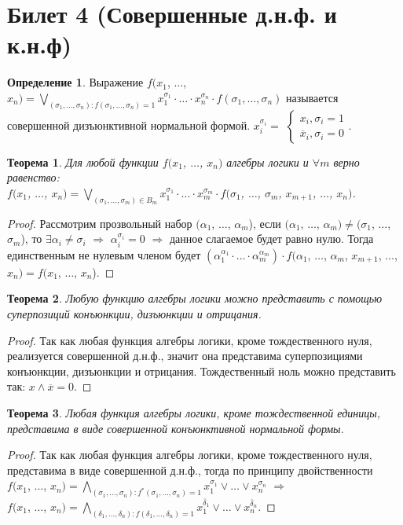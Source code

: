 \documentclass[a4paper, 12pt]{article}
\theoremstyle{definition}
\newtheorem*{definition}{Определение}
\theoremstyle{plain}
\newtheorem*{theorem}{Теорема}
\theoremstyle{remark}
\begin{document}
  \section{Билет 4 (Совершенные д.н.ф. и к.н.ф)}
  \begin{definition}
    Выражение $f(x_1$, $\ldots$, $x_n)=\bigvee\limits_{(\sigma_1, \ldots,\sigma_n):f(\sigma_1, \ldots,\sigma_n)=1}x_1^{\sigma_1}\cdot\ldots\cdot x_n^{\sigma_n}\cdot f(\sigma_1,\ldots ,\sigma_n)$ называется совершенной дизъюнктивной нормальной формой. $x_i^{\sigma_i}=$
    $\begin{cases}
      x_i,\sigma_i=1\\
      \overline{x}_i,\sigma_i=0
    \end{cases}$.
  \end{definition}
  \begin{theorem}
    Для любой функции $f(x_1$, $\ldots$, $x_n)$ алгебры логики и $\forall m$ верно равенство:\\
    $f(x_1$, $\ldots$, $x_n)=\bigvee\limits_{(\sigma_1, \ldots,\sigma_m)\in B_m}x_1^{\sigma_1}\cdot\ldots\cdot x_m^{\sigma_m}\cdot f(\sigma_1$, $\ldots$, $\sigma_m$, $x_{m+1}$, $\ldots$, $x_n)$.
  \end{theorem}
  \begin{proof}
    Рассмотрим прозвольный набор $(\alpha_1$, $\ldots$, $\alpha_m$), если $(\alpha_1$, $\ldots$, $\alpha_m)\neq(\sigma_1$, $\ldots$, $\sigma_m$), то $\exists \alpha_i\neq\sigma_i$ $\Longrightarrow$ $\alpha_i^{\sigma_i}=0$ $\Longrightarrow$ данное слагаемое будет равно нулю. Тогда единственным не нулевым членом будет $(\alpha_1^{\alpha_1}\cdot\ldots\cdot\alpha_m^{\alpha_m})\cdot f(\alpha_1$, $\ldots$, $\alpha_m$, $x_{m+1}$, $\ldots$, $x_n)=f(x_1$, $\ldots$, $x_n$).
  \end{proof}
  \begin{theorem}
    Любую функцию алгебры логики можно представить с помощью суперпозиций конъюнкции, дизъюнкции и отрицания.
  \end{theorem}
  \begin{proof}
    Так как любая функция алгебры логики, кроме тождественного нуля, реализуется совершенной д.н.ф., значит она представима суперпозициями конъюнкции, дизъюнкции и отрицания. Тождественный ноль можно представить так: $x\wedge\overline{x}=0$.
  \end{proof}
  \begin{theorem}
    Любая функция алгебры логики, кроме тождественной единицы, представима в виде совершенной конъюнктивной нормальной формы.
  \end{theorem}
  \begin{proof}
    Так как любая функция алгебры логики, кроме тождественного нуля, представима в виде совершенной д.н.ф., тогда по принципу двойственности\\
    $f(x_1$, $\ldots$, $x_n)=\bigwedge\limits_{(\sigma_1, \ldots,\sigma_n):f^*(\sigma_1, \ldots,\sigma_n)=1}x_1^{\sigma_1}\vee\ldots\vee x_n^{\sigma_n}$ $\Longrightarrow$\\
    $f(x_1$, $\ldots$, $x_n)=\bigwedge\limits_{(\delta_1, \ldots,\delta_n):f(\delta_1, \ldots,\delta_n)=1}x_1^{\overline{\delta}_1}\vee\ldots\vee x_n^{\overline{\delta}_n}$.
  \end{proof}
\end{document}
